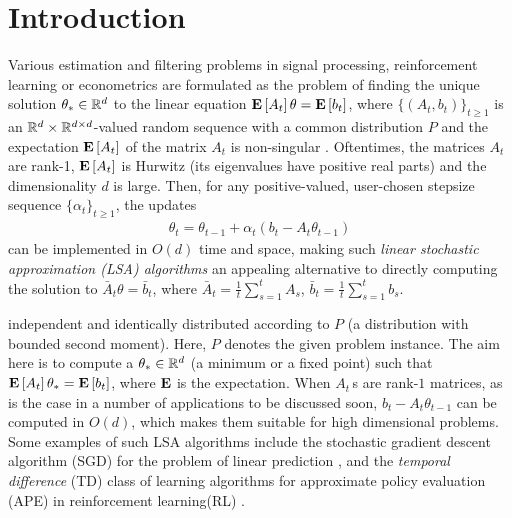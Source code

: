 
\section{Introduction}\label{sec:intro}
Various estimation and filtering problems in signal processing, reinforcement learning or econometrics
are formulated as the problem of finding the unique solution $\theta_*\in \mathbb{R}^d$ 
to the linear equation $\mathbf{E}\left[A_t\right] \theta = \mathbf{E}\left[b_t\right]$,
where $\{(A_t,b_t)\}_{t\ge 1}$ is an $\mathbb{R}^d \times \mathbb{R}^{d \times d}$-valued random sequence with a common distribution $P$
and the expectation $\mathbf{E}\left[A_t\right]$ of the matrix $A_t$ is non-singular \citep[e.g.,][]{bemepri90,LjPfWa92,SoKo94,degylu96,
sutton,konda-tsitsiklis,KoTsi03LSA,gtd,gtd2,gtdmp}.
Oftentimes, the matrices $A_t$ are rank-1, $\mathbf{E}\left[A_t\right]$ is Hurwitz (its eigenvalues have positive real parts)
and the dimensionality $d$ is large.
Then, for any positive-valued, user-chosen stepsize sequence $\{\alpha_t\}_{t\ge 1}$, the updates
\begin{align}\label{eq:lsaintro}
\theta_t=\theta_{t-1}+\alpha_t (b_t-A_t \theta_{t-1})
\end{align}
can be implemented in $O(d)$ time and space, making such 
\emph{linear stochastic approximation (LSA) algorithms} 
an appealing alternative to directly 
computing the solution to $\bar A_t \theta = \bar b_t$, where $\bar A_t = \frac1t\sum_{s=1}^t A_s$, $\bar b_t = \frac1t \sum_{s=1}^t b_s$.

independent and identically distributed according to $P$ (a distribution with bounded second moment). Here, $P$ denotes the given problem instance. The aim here is to compute a $\theta_*\in\mathbb{R}^d$ (a minimum or a fixed point) such that $\mathbf{E}\left[A_t\right]\theta_*=\mathbf{E}\left[b_t\right]$, where $\mathbf{E}$ is the expectation. When $A_t\,$s are rank-$1$ matrices, as is the case in a number of applications to be discussed soon, $b_t -A_t\theta_{t-1}$ can be computed in $O(d)$, which makes them suitable for high dimensional problems. Some examples of such LSA algorithms include the stochastic gradient descent algorithm (SGD) for the problem of linear prediction \cite{bach,bachaistats}, and the \emph{temporal difference} (TD) class of learning algorithms for approximate policy evaluation (APE) in reinforcement learning(RL) \cite{sutton,konda-tsitsiklis,KoTsi03LSA,gtd,gtd2,gtdmp}.
\fi

